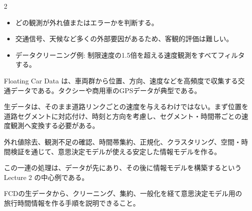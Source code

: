 \begin{multicols}{2}

\footnotesize

\raggedcolumns


\begin{itemize}
\item どの観測が外れ値またはエラーかを判断する。
\item 交通信号、天候など多くの外部要因があるため、客観的評価は難しい。
\item データクリーニング例: 制限速度の1.5倍を超える速度観測をすべてフィルタする。
\end{itemize}

Floating Car Data は、車両群から位置、方向、速度などを高頻度で収集する交通データである。タクシーや商用車のGPSデータが典型である。\par

生データは、そのまま道路リンクごとの速度を与えるわけではない。まず位置を道路セグメントに対応付け、時刻と方向を考慮し、セグメント・時間帯ごとの速度観測へ変換する必要がある。\par

外れ値除去、観測不足の確認、時間帯集約、正規化、クラスタリング、空間・時間検証を通じて、意思決定モデルが使える安定した情報モデルを作る。\par

この一連の処理は、データが先にあり、その後に情報モデルを構築するという Lecture 2 の中心例である。\par

FCDの生データから、クリーニング、集約、一般化を経て意思決定モデル用の旅行時間情報を作る手順を説明できること。\par



\end{multicols}
